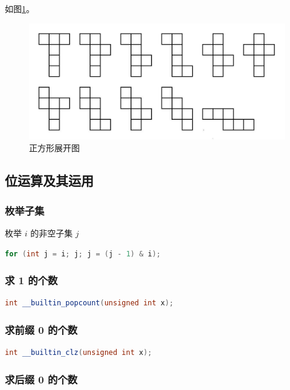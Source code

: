 \documentclass{article}
\begin{document}
如图\ref{zhengfangti}。

\begin{figure}[!hbp]
	\centering
	\includegraphics[scale=0.5]{zhengfangti.jpg}
	\caption{正方形展开图}
	\label{zhengfangti}
\end{figure}

\subsection{位运算及其运用}

\subsubsection{枚举子集}

枚举 $i$ 的非空子集 $j$

\begin{lstlisting}[language=C++]
for (int j = i; j; j = (j - 1) & i);
\end{lstlisting}

\subsubsection{求 1 的个数}

\begin{lstlisting}[language=C++]
int __builtin_popcount(unsigned int x);
\end{lstlisting}

\subsubsection{求前缀 0 的个数}

\begin{lstlisting}[language=C++]
int __builtin_clz(unsigned int x);
\end{lstlisting}

\subsubsection{求后缀 0 的个数}
\end{document}
